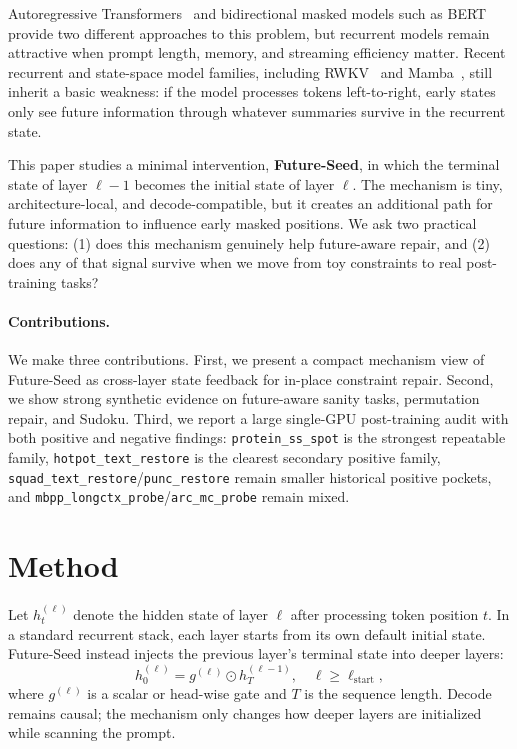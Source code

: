 \documentclass{article}
\begin{document}
Autoregressive Transformers~\citep{vaswani2017attention} and bidirectional masked models such as BERT~\citep{devlin2019bert} provide two different approaches to this problem, but recurrent models remain attractive when prompt length, memory, and streaming efficiency matter. Recent recurrent and state-space model families, including RWKV~\citep{peng2023rwkv} and Mamba~\citep{gu2024mamba}, still inherit a basic weakness: if the model processes tokens left-to-right, early states only see future information through whatever summaries survive in the recurrent state.

This paper studies a minimal intervention, \textbf{Future-Seed}, in which the terminal state of layer $\ell-1$ becomes the initial state of layer $\ell$. The mechanism is tiny, architecture-local, and decode-compatible, but it creates an additional path for future information to influence early masked positions. We ask two practical questions: (1) does this mechanism genuinely help future-aware repair, and (2) does any of that signal survive when we move from toy constraints to real post-training tasks?

\paragraph{Contributions.}
We make three contributions. First, we present a compact mechanism view of Future-Seed as cross-layer state feedback for in-place constraint repair. Second, we show strong synthetic evidence on future-aware sanity tasks, permutation repair, and Sudoku. Third, we report a large single-GPU post-training audit with both positive and negative findings: \texttt{protein\_ss\_spot} is the strongest repeatable family, \texttt{hotpot\_text\_restore} is the clearest secondary positive family, \texttt{squad\_text\_restore}/\texttt{punc\_restore} remain smaller historical positive pockets, and \texttt{mbpp\_longctx\_probe}/\texttt{arc\_mc\_probe} remain mixed.

\section{Method}
Let $h_t^{(\ell)}$ denote the hidden state of layer $\ell$ after processing token position $t$. In a standard recurrent stack, each layer starts from its own default initial state. Future-Seed instead injects the previous layer's terminal state into deeper layers:
\begin{equation}
    h_0^{(\ell)} = g^{(\ell)} \odot h_T^{(\ell-1)}, \quad \ell \geq \ell_{\mathrm{start}},
\end{equation}
where $g^{(\ell)}$ is a scalar or head-wise gate and $T$ is the sequence length. Decode remains causal; the mechanism only changes how deeper layers are initialized while scanning the prompt.
\end{document}
